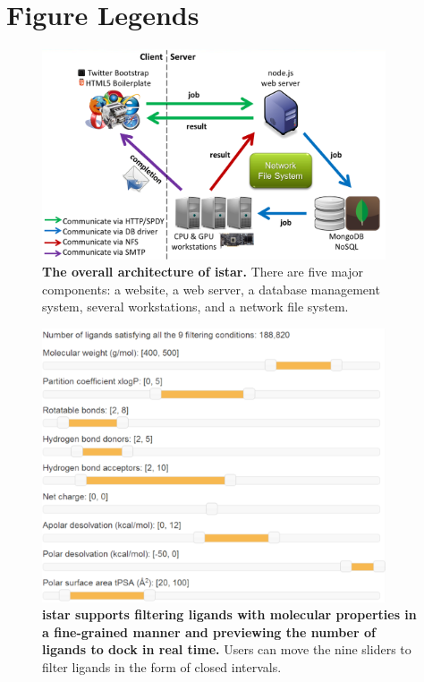 \documentclass[10pt]{article}
\begin{document}


\section*{Figure Legends}

\begin{figure}[!ht]
\begin{center}
\includegraphics[width=4in]{Architecture.eps}
\end{center}
\caption{
{\bf The overall architecture of istar.} There are five major components: a website, a web server, a database management system, several workstations, and a network file system.
}
\label{Architecture}
\end{figure}

\begin{figure}[!ht]
\begin{center}
\includegraphics[width=4in]{Slider.eps}
\end{center}
\caption{
{\bf istar supports filtering ligands with molecular properties in a fine-grained manner and previewing the number of ligands to dock in real time.} Users can move the nine sliders to filter ligands in the form of closed intervals.
}
\label{Slider}
\end{figure}
\end{document}
